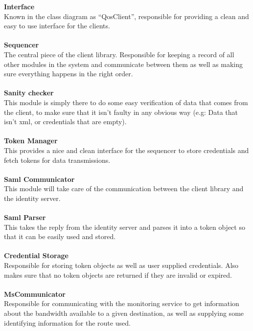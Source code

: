 		\indent \indent \textbf{Interface} \\
Known in the class diagram as “QosClient”, responsible for providing a clean and easy to use interface for the clients.
\\\\
		\indent \textbf{Sequencer} \\
The central piece of the client library. Responsible for keeping a record of all other modules in the system and communicate between them as well as making sure everything happens in the right order.
\\\\
		\indent \textbf{Sanity checker} \\
This module is simply there to do some easy verification of data that comes from the client, to make sure that it isn’t faulty in any obvious way (e.g: Data that isn’t xml, or credentials that are empty).
\\\\
		\indent \textbf{Token Manager} \\
This provides a nice and clean interface for the sequencer to store credentials and fetch tokens for data transmissions.
\\\\
		\indent \textbf{Saml Communicator} \\
This module will take care of the communication between the client library and the identity server.
\\\\
		\indent \textbf{Saml Parser} \\
This takes the reply from the identity server and parses it into a token object so that it can be easily used and stored.
\\\\
		\indent \textbf{Credential Storage} \\
Responsible for storing token objects as well as user supplied credentials. Also makes sure that no token objects are returned if they are invalid or expired.
\\\\
		\indent \textbf{MsCommunicator} \\
Responsible for communicating with the monitoring service to get information about the bandwidth available to a given destination, as well as supplying some identifying information for the route used.

